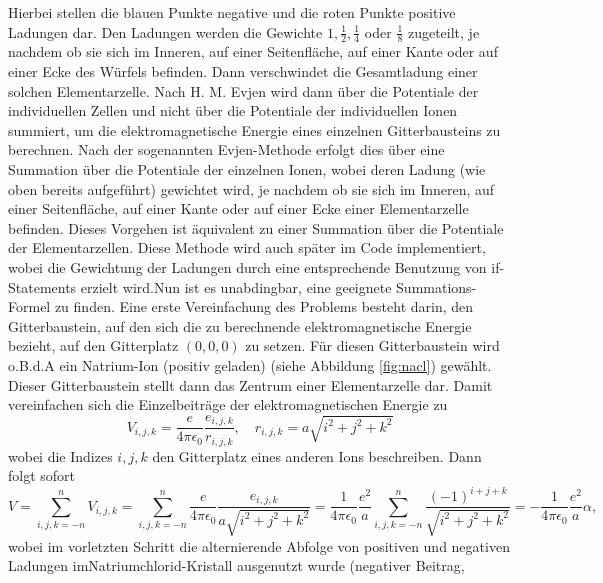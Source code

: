 \documentclass[11pt,a4paper]{article}
\begin{document}
Hierbei stellen die blauen Punkte negative und die roten Punkte positive Ladungen dar. Den Ladungen werden die Gewichte $1, \frac{1}{2}, \frac{1}{4}$ oder $\frac{1}{8}$
zugeteilt, je nachdem ob sie sich im Inneren, auf einer Seitenfläche, auf einer Kante oder auf einer Ecke des Würfels befinden. Dann verschwindet die Gesamtladung einer solchen
Elementarzelle. Nach H. M. Evjen \cite{key2} wird dann über die Potentiale der individuellen Zellen und nicht über die Potentiale der individuellen Ionen summiert, um die elektromagnetische Energie
eines einzelnen Gitterbausteins zu berechnen. Nach der sogenannten Evjen-Methode erfolgt dies über eine Summation über die Potentiale der einzelnen Ionen, wobei deren Ladung (wie oben bereits aufgeführt) gewichtet wird, je nachdem ob sie sich im Inneren,
auf einer Seitenfläche, auf einer Kante oder auf einer Ecke einer Elementarzelle befinden. Dieses Vorgehen ist äquivalent zu einer Summation über die Potentiale der Elementarzellen. Diese Methode
wird auch später im Code implementiert, wobei die Gewichtung der Ladungen durch eine entsprechende Benutzung von if-Statements erzielt wird.\newline Nun ist es unabdingbar, eine geeignete Summations-Formel zu finden.
Eine erste Vereinfachung des Problems besteht darin, den Gitterbaustein, auf den sich die zu berechnende elektromagnetische Energie bezieht, auf den Gitterplatz $(0,0,0)$ zu setzen. Für diesen
Gitterbaustein wird o.B.d.A ein Natrium-Ion (positiv geladen) (siehe Abbildung \ref{fig:nacl}) gewählt. Dieser Gitterbaustein stellt dann das Zentrum einer Elementarzelle dar. Damit vereinfachen sich die Einzelbeiträge der elektromagnetischen Energie zu
\begin{equation*}
    V_{i,j,k} = \frac{e}{4\pi\epsilon_0}\frac{e_{i,j,k}}{r_{i,j,k}}, \quad r_{i,j,k} = a \sqrt{i^2 + j^2 + k^2}
\end{equation*} wobei die Indizes $i,j,k$ den Gitterplatz eines anderen Ions beschreiben. Dann folgt sofort
\begin{equation*}
    V = \sum_{i,j,k=-n}^{n} V_{i,j,k} = \sum_{i,j,k=-n}^{n} \frac{e}{4\pi\epsilon_0} \frac{e_{i,j,k}}{a \sqrt{i^2 + j^2 + k^2}} = \frac{1}{4\pi\epsilon_0} \frac{e^2}{a} \sum_{i,j,k=-n}^{n} \frac{(-1)   ^{i+j+k}}{\sqrt{i^2 + j^2 + k^2}} = -\frac{1}{4\pi\epsilon_0} \frac{e^2}{a} \alpha,
\end{equation*} wobei im vorletzten Schritt die alternierende Abfolge von positiven und negativen Ladungen im\newline Natriumchlorid-Kristall ausgenutzt wurde (negativer Beitrag,
\end{document}
